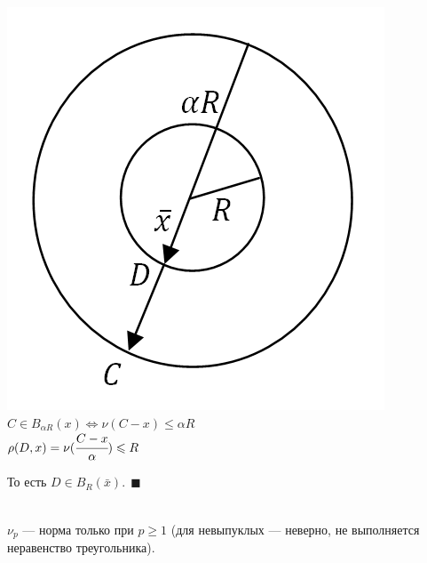 \documentclass[12pt]{article}
\theoremstyle{definition}
\numberwithin{equation}{section}
\begin{document}
\begin{enumerate}
\begin{center}
			\includegraphics[scale=0.5]{l4_10.png}\\
			$C \in B_{\alpha R}(x) \Leftrightarrow \nu(C-x) \leqslant \alpha R$\\
			$\rho(D, x) = \nu(\cfrac{C-x}{\alpha}) \leqslant R$\end{center} То есть $D \in B_R(\bar x). ~~\blacksquare$
	\end{enumerate}
	~\\$\nu_p$ --- норма только при $p \geqslant 1$ (для невыпуклых --- неверно, не выполняется неравенство треугольника).\\
\end{document}
